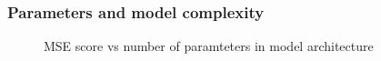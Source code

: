 \documentclass
[twocolumn,
secnumarabic,
nobibnotes,
aps,
prl,
reprint,
groupedaddress,
amsmath,
amssymb
]{revtex4-2}
\begin{document}
\subsubsection{Parameters and model complexity}
\begin{figure}[htb]
  \caption{MSE score vs number of paramteters in model architecture\label{fig:NN_model_complexity}}
\end{figure}
\end{document}
